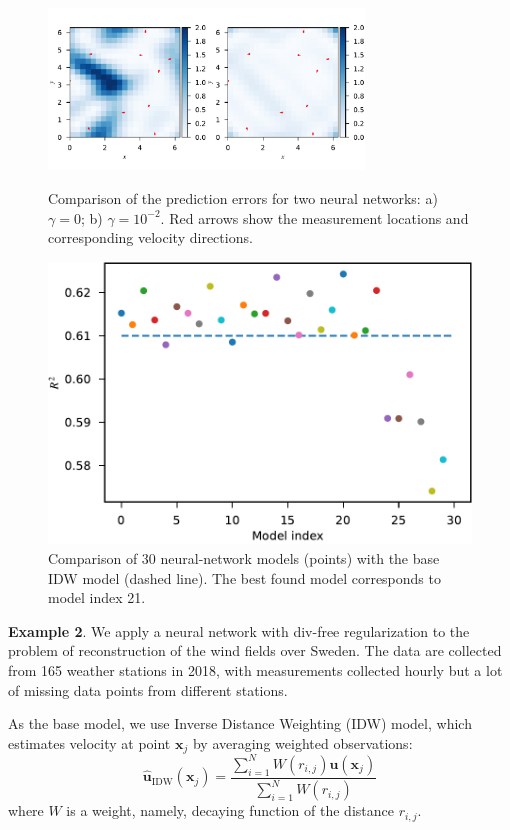\documentclass[pamm,a4paper,fleqn]{w-art}
\renewcommand{\vec}[1]{\boldsymbol{#1}}
\begin{document}
\begin{figure}
\begin{minipage}{0.48\textwidth}
  \includegraphics[width=3.3in]{assets/error-fields-comparison.pdf}
  \caption{Comparison of the prediction errors for two neural networks:
  a) $\gamma=0$; b) $\gamma=10^{-2}$.
  Red arrows show the measurement locations and corresponding
  velocity directions.}%
  \label{fig:tg2d}
\end{minipage}
\hfill
\begin{minipage}{0.48\textwidth}
  \centering
  \includegraphics[scale=0.42]{assets/r2-vs-model.pdf}
  \caption{Comparison of 30 neural-network models (points)
    with the base IDW model (dashed line).
  The best found model corresponds to model index 21.}%
  \label{fig:r2-vs-model}
\end{minipage}
\end{figure}

\textbf{Example 2}.
We apply a neural network with div-free regularization to the problem of
reconstruction of the wind fields over Sweden.
The data are collected from 165 weather stations in 2018, with measurements
collected hourly but a lot of missing data points from different stations.

As the base model, we use Inverse Distance Weighting (IDW) model, which
estimates velocity at point $\vec x_j$ by averaging weighted observations:
\begin{equation}
  \label{eq:base-model}
  \hat{\vec u}_{\text{IDW}}(\vec x_j) =
  \frac{\sum_{i=1}^N W(r_{i,j}) \vec u(\vec x_j)}{\sum_{i=1}^N W(r_{i,j})}
\end{equation}
where $W$ is a weight, namely, decaying function of the distance $r_{i, j}$.
\end{document}

